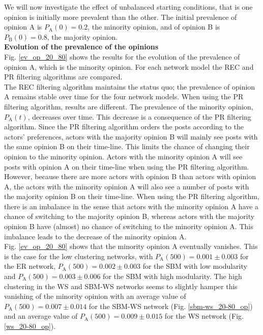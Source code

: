 \documentclass[11 pt , letterpaper , twoside , openright]{book}
\begin{document}
We will now investigate the effect of unbalanced starting conditions, that is one opinion is initially more prevalent than the other. The initial prevalence of opinion A is $P_\text{A}(0) = 0.2$, the minority opinion, and of opinion B is $P_\text{B}(0) = 0.8$, the majority opinion.\\ 
\newline
\textbf{Evolution of the prevalence of the opinions}\\
\newline
Fig. \ref{ev_op_20_80} shows the results for the evolution of the prevalence of opinion A, which is the minority opinion. For each network model the REC and PR filtering algorithms are compared. \\
\newline
The REC filtering algorithm maintains the status quo; the prevalence of opinion A remains stable over time for the four network models. When using the PR filtering algorithm, results are different. The prevalence of the minority opinion, $P_\text{A}(t)$, decreases over time. This decrease is a consequence of the PR filtering algorithm. Since the PR filtering algorithm orders the posts according to the actors' preferences, actors with the majority opinion B will mainly see posts with the same opinion B on their time-line. This limits the chance of changing their opinion to the minority opinion. Actors with the minority opinion A will see posts with opinion A on their time-line when using the PR filtering algorithm. However, because there are more actors with opinion B than actors with opinion A, the actors with the minority opinion A will also see a number of posts with the majority opinion B on their time-line. When using the PR filtering algorithm, there is an imbalance in the sense that actors with the minority opinion A have a chance of switching to the majority opinion B, whereas actors with the majority opinion B have (almost) no chance of switching to the minority opinion A. This imbalance leads to the decrease of the minority opinion A.\\
\newline
Fig. \ref{ev_op_20_80} shows that the minority opinion A eventually vanishes. This is the case for the low clustering networks, with $P_\text{A}(500) = 0.001 \pm 0.003$ for the ER network, $P_\text{A}(500) = 0.002 \pm 0.003$ for the SBM with low modularity and $P_\text{A}(500) = 0.003 \pm 0.006$ for the SBM with high modularity. The high clustering in the WS and SBM-WS networks seems to slightly hamper this vanishing of the minority opinion with an average value of $P_\text{A}(500) = 0.007 \pm 0.014$ for the SBM-WS network (Fig. \ref{sbm-ws_20-80_op}) and an average value of $P_\text{A}(500) = 0.009 \pm 0.015$ for the WS network (Fig. \ref{ws_20-80_op}).
\end{document}
